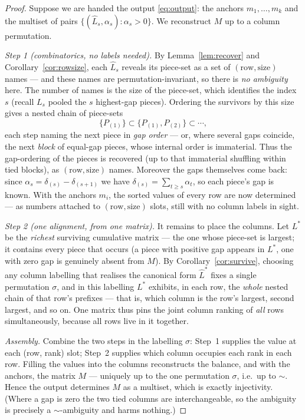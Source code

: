 \documentclass[11pt,a4paper]{article}
\theoremstyle{definition}
\theoremstyle{plain}
\newcommand{\bary}{\widehat}      %
\begin{document}
\begin{proof}
Suppose we are handed the output \eqref{eq:output}: the anchors $m_1,\dots,m_k$
and the multiset of pairs $\{(\bary L_s,\alpha_s):\alpha_s>0\}$. We reconstruct
$M$ up to a column permutation.

\smallskip
\emph{Step 1 (combinatorics, no labels needed).}
By Lemma~\ref{lem:recover} and Corollary~\ref{cor:rowsize}, each $\bary L_s$
reveals its piece-set as a set of $(\text{row},\text{size})$ names --- and these
names are permutation-invariant, so there is \emph{no ambiguity} here. The
number of names is the size of the piece-set, which identifies the index $s$
(recall $L_s$ pooled the $s$ highest-gap pieces). Ordering the survivors by this
size gives a nested chain of piece-sets
\[
   \{P_{(1)}\}\subset\{P_{(1)},P_{(2)}\}\subset\cdots,
\]
each step naming the next piece in \emph{gap order} --- or, where several gaps
coincide, the next \emph{block} of equal-gap pieces, whose internal order is
immaterial. Thus the gap-ordering of the pieces is recovered (up to that
immaterial shuffling within tied blocks), as $(\text{row},\text{size})$ names. Moreover the
gaps themselves come back: since $\alpha_s=\delta_{(s)}-\delta_{(s+1)}$ we have
$\delta_{(s)}=\sum_{t\ge s}\alpha_t$, so each piece's gap is known. With the
anchors $m_i$, the sorted values of every row are now determined --- as numbers
attached to $(\text{row},\text{size})$ slots, still with no column labels in
sight.

\smallskip
\emph{Step 2 (one alignment, from one matrix).}
It remains to place the columns. Let $L^\ast$ be the \emph{richest} surviving
cumulative matrix --- the one whose piece-set is largest; it contains every
piece that occurs (a piece with positive gap appears in $L^\ast$, one with zero
gap is genuinely absent from $M$). By Corollary~\ref{cor:survive}, choosing any
column labelling that realises the canonical form $\bary L^\ast$ fixes a single
permutation $\sigma$, and in this labelling $L^\ast$ exhibits, in each row, the
\emph{whole} nested chain of that row's prefixes --- that is, which column is the
row's largest, second largest, and so on. One matrix thus pins the joint column
ranking of \emph{all} rows simultaneously, because all rows live in it together.

\smallskip
\emph{Assembly.}
Combine the two steps in the labelling $\sigma$: Step~1 supplies the value at
each (row, rank) slot; Step~2 supplies which column occupies each rank in each
row. Filling the values into the columns reconstructs the balance, and with the
anchors, the matrix $M$ --- uniquely up to the one permutation $\sigma$, i.e.\
up to $\sim$. Hence the output determines $M$ as a multiset, which is exactly
injectivity. (Where a gap is zero the two tied columns are interchangeable, so
the ambiguity is precisely a $\sim$-ambiguity and harms nothing.)
\end{proof}
\end{document}
